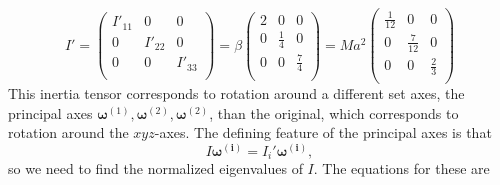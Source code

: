 \documentclass{article}
\begin{document}
        \begin{equation*}
            I' = 
            \begin{pmatrix}
                I'_{11} & 0 & 0 \\
                0 & I'_{22} & 0 \\
                0 & 0 & I'_{33} \\
            \end{pmatrix}
            = \beta
            \begin{pmatrix}
                2 & 0 & 0 \\
                0 & \frac{1}{4} & 0 \\
                0 & 0 & \frac{7}{4} \\
            \end{pmatrix}
            = Ma^2
            \begin{pmatrix}
                \frac{1}{12} & 0 & 0 \\
                0 & \frac{7}{12} & 0  \\
                0 & 0 & \frac{2}{3} \\
            \end{pmatrix}
        \end{equation*}
        This inertia tensor corresponds to rotation around a different set axes, the principal axes $\boldsymbol{\omega}^{(1)}, \boldsymbol{\omega}^{(2)}, \boldsymbol{\omega}^{(2)}$, than the original, which corresponds to rotation around the $xyz$-axes. The defining feature of the principal axes is that
        \begin{equation*}
            I \boldsymbol{\omega^{(i)}} = I_i' \boldsymbol{\omega^{(i)}},
        \end{equation*}
        so we need to find the normalized eigenvalues of $I$. The equations for these are
\end{document}
